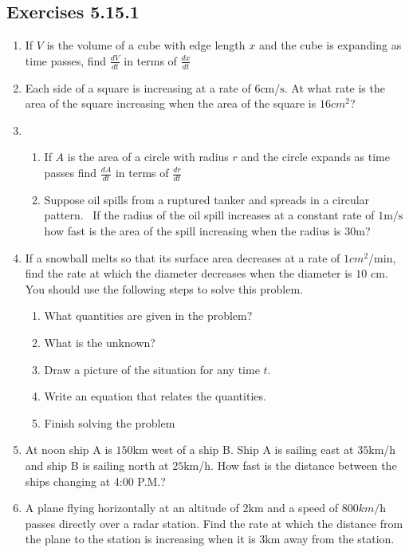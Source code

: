 \subsection{Exercises 5.15.1}
\begin{enumerate}
\item If $V$ is the volume of a cube with edge length $x$ and the cube is expanding as time passes, find $\frac{d V}{d t}$ in terms of $\frac{d x}{d t}$ 

\item Each side of a square is increasing at a rate of $6 \mbox{cm}$/$\mbox{s}$. At what rate is the area of
the square increasing when the area of the square is $16 cm^{2}$? 

\item  


\begin{enumerate}
\item If $A$ is the area of a circle with radius $r$ and the circle expands as time passes find $\frac{d A}{d t}$ in terms of $\frac{d r}{d t}$ 

\item Suppose oil spills from a ruptured tanker and spreads in a circular pattern.
\ If the radius of the oil spill increases at a constant rate of $1 \mathrm{m}/\mbox{s}$ how fast is the area of the spill increasing when the radius is $30 \mbox{m}$? \end{enumerate}


\item If
a snowball melts so that its surface area decreases at a rate of $1 cm^{2}$/$\mbox{min}$, find the rate at which the diameter decreases when the diameter is $10$ $\mbox{cm}$. You should use the following steps to solve this
problem. 


\begin{enumerate}
\item What quantities are given in the problem? 

\item What is
the unknown? 

\item Draw a picture of the situation for any time $t$. 

\item Write an equation that relates the quantities. 

\item Finish
solving the problem \end{enumerate}


\item At noon ship A is $150 \mbox{km}$ west of a ship B. Ship A is sailing east at $35 \mbox{km}$/$\mbox{h}$ and ship B is sailing north at $25 \mbox{km}$/$\mbox{h}$. How fast is the distance between
the ships changing at 4:00 P.M.? 

\item A plane flying horizontally at an altitude of $2 \mbox{km}$ and a speed of $800 km/\mbox{h}$ passes directly over a radar station. Find the rate at which the distance from the plane
to the station is increasing when it is $3 \mbox{km}$ away from the station. \end{enumerate}



